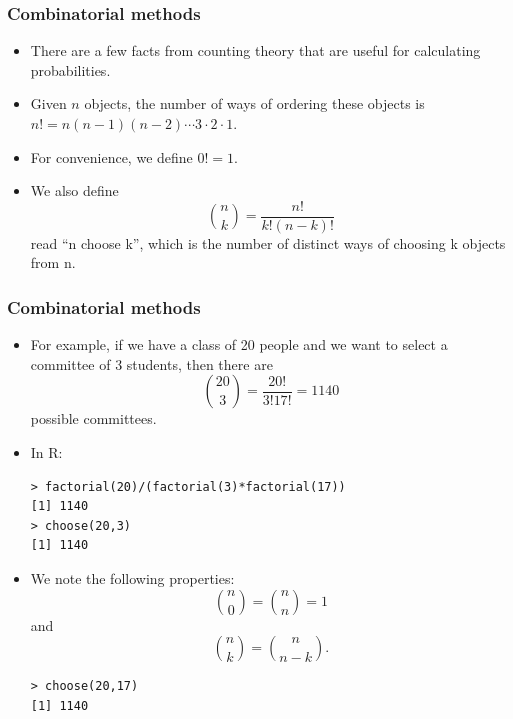 \documentclass[handout]{beamer}
\begin{document}
\begin{frame}\frametitle{Combinatorial methods}
\begin{scriptsize}


\begin{itemize} 
 \item There are a few facts from counting theory that are useful for calculating probabilities.
 \item Given $n$ objects, the number of ways of ordering these objects is $n!=n(n-1)(n-2)\cdots3\cdot2\cdot1$.
 \item For convenience, we define $0!=1$.
 \item We also define 
 \begin{displaymath}
  {n \choose k} = \frac{n!}{k!(n-k)!}
 \end{displaymath}
read ``n choose k'', which is the number of distinct ways of choosing k objects from n.
\end{itemize} 

\end{scriptsize} 

\end{frame}

\begin{frame}[fragile]\frametitle{Combinatorial methods}
\begin{scriptsize}


\begin{itemize} 
\item For example, if we have a class of 20 people and we want to select a committee of 3 students, then there are
 \begin{displaymath}
  {20 \choose 3} = \frac{20!}{3!17!}=1140
 \end{displaymath}
 possible committees.
 
\item In R:
 
 \begin{verbatim}
> factorial(20)/(factorial(3)*factorial(17))
[1] 1140
> choose(20,3)
[1] 1140  
 \end{verbatim}

 
 
 \item We note the following properties: 
 \begin{displaymath}
  {n \choose 0} = {n \choose n}=1
 \end{displaymath}
and
 \begin{displaymath}
  {n \choose k} = {n \choose n-k}.
 \end{displaymath}

\begin{verbatim}
> choose(20,17)
[1] 1140 
\end{verbatim}

 
 
\end{itemize} 
 
\end{scriptsize} 

\end{frame}
\end{document}
